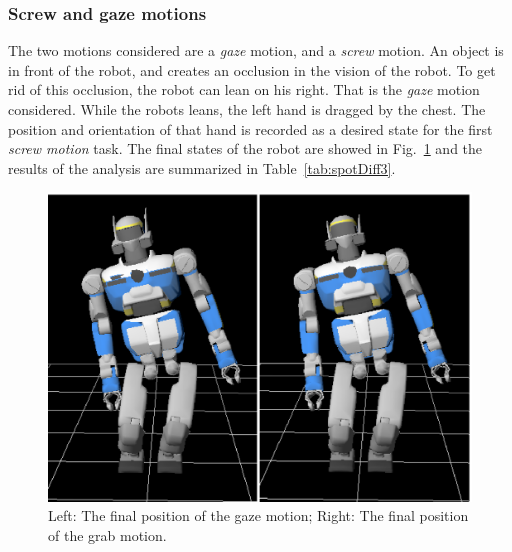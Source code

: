 \documentclass[letterpaper, 10pt, conference]{ieeeconf}      %
\begin{document}
\subsubsection{Screw and gaze motions}
\label{sec:distinc3}
The two motions considered are a \emph{gaze} motion, and a \emph{screw} motion. An object
is in front of the robot, and creates an occlusion in the vision of the robot.
To get rid of this occlusion, the robot can lean on his right. That is the \emph{gaze}
motion considered. While the robots leans, the left hand is dragged by the chest.
The position and orientation of that hand is recorded as a desired state for the first \emph{screw motion} task.
The final states of the robot are showed in Fig.~\ref{fig:spotDiff3}
and the results of the analysis are summarized in Table~\ref{tab:spotDiff3}.
\begin{figure}[t]
\begin{center}
\includegraphics[width=0.66\linewidth]{img/spotDiff3.ps}
\end{center}
\caption{Left: The final position of the gaze motion; Right: The final position of the grab motion.}
\label{fig:spotDiff3}
\end{figure}
\end{document}
